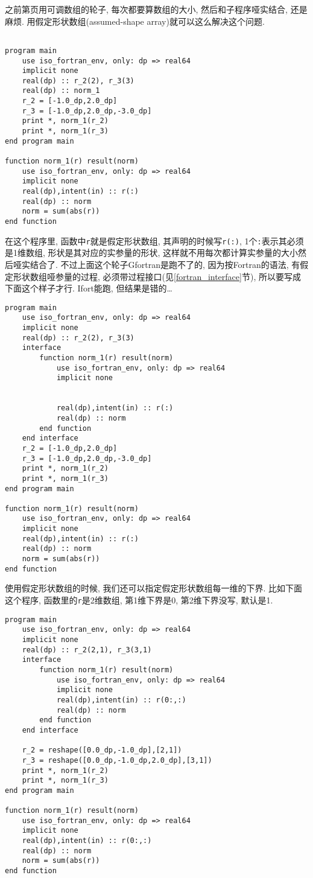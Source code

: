 之前第\pageref{adjustable_array}页用可调数组的轮子, 每次都要算数组的大小, 然后和子程序哑实结合, 还是麻烦. 用假定形状数组(assumed-shape array)就可以这么解决这个问题.
\begin{lstlisting}

program main
    use iso_fortran_env, only: dp => real64
    implicit none
    real(dp) :: r_2(2), r_3(3)
    real(dp) :: norm_1
    r_2 = [-1.0_dp,2.0_dp]
    r_3 = [-1.0_dp,2.0_dp,-3.0_dp]
    print *, norm_1(r_2)
    print *, norm_1(r_3)
end program main

function norm_1(r) result(norm)
    use iso_fortran_env, only: dp => real64
    implicit none
    real(dp),intent(in) :: r(:)
    real(dp) :: norm
    norm = sum(abs(r))
end function
\end{lstlisting}
在这个程序里, 函数中\texttt{r}就是假定形状数组, 其声明的时候写\texttt{r(:)}, 1个\texttt{:}表示其必须是1维数组, 形状是其对应的实参量的形状, 这样就不用每次都计算实参量的大小然后哑实结合了. 不过上面这个轮子Gfortran是跑不了的, 因为按Fortran的语法, 有假定形状数组哑参量的过程, 必须带过程接口(见\ref{fortran_interface}节), 所以要写成下面这个样子才行. Ifort能跑, 但结果是错的\dots\label{assumed-shape_array_program}
\begin{lstlisting}
program main
    use iso_fortran_env, only: dp => real64
    implicit none
    real(dp) :: r_2(2), r_3(3)
    interface
        function norm_1(r) result(norm)
            use iso_fortran_env, only: dp => real64
            implicit none


            real(dp),intent(in) :: r(:)
            real(dp) :: norm
        end function
    end interface
    r_2 = [-1.0_dp,2.0_dp]
    r_3 = [-1.0_dp,2.0_dp,-3.0_dp]
    print *, norm_1(r_2)
    print *, norm_1(r_3)
end program main

function norm_1(r) result(norm)
    use iso_fortran_env, only: dp => real64
    implicit none
    real(dp),intent(in) :: r(:)
    real(dp) :: norm
    norm = sum(abs(r))
end function
\end{lstlisting}
使用假定形状数组的时候, 我们还可以指定假定形状数组每一维的下界. 比如下面这个程序, 函数里的\texttt{r}是2维数组, 第1维下界是0, 第2维下界没写, 默认是1.
\begin{lstlisting}
program main
    use iso_fortran_env, only: dp => real64
    implicit none
    real(dp) :: r_2(2,1), r_3(3,1)
    interface
        function norm_1(r) result(norm)
            use iso_fortran_env, only: dp => real64
            implicit none
            real(dp),intent(in) :: r(0:,:)
            real(dp) :: norm
        end function
    end interface

    r_2 = reshape([0.0_dp,-1.0_dp],[2,1])
    r_3 = reshape([0.0_dp,-1.0_dp,2.0_dp],[3,1])
    print *, norm_1(r_2)
    print *, norm_1(r_3)
end program main

function norm_1(r) result(norm)
    use iso_fortran_env, only: dp => real64
    implicit none
    real(dp),intent(in) :: r(0:,:)
    real(dp) :: norm
    norm = sum(abs(r))
end function
\end{lstlisting}


